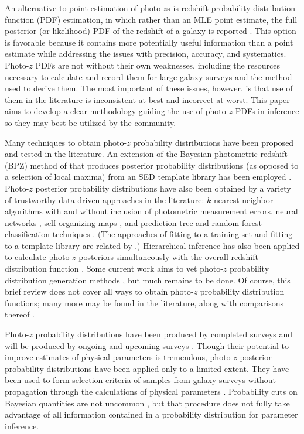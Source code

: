 An alternative to point estimation of photo-$z$s is redshift probability distribution function (PDF) estimation, in which rather than an MLE point estimate, the full posterior (or likelihood) PDF of the redshift of a galaxy is reported \citep{Koo1999}.  
This option is favorable because it contains more potentially useful information than a point estimate while addressing the issues with precision, accuracy, and systematics.  
Photo-$z$ PDFs are not without their own weaknesses, including the resources necessary to calculate and record them for large galaxy surveys \citep{CarrascoKind2014} and the method used to derive them.  
The most important of these issues, however, is that use of them in the literature is inconsistent at best and incorrect at worst.  
This paper aims to develop a clear methodology guiding the use of photo-$z$ PDFs in inference so they may best be utilized by the community.

Many techniques to obtain photo-$z$ probability distributions have been proposed and tested in the literature.  
An extension of the Bayesian photometric redshift (BPZ) method of \citet{Benitez2000} that produces posterior probability distributions (as opposed to a selection of local maxima) from an SED template library has been employed \citep{Hildebrandt2012, Kelly2014, Lopez-Sanjuan2015}.  
Photo-$z$ posterior probability distributions have also been obtained by a variety of trustworthy data-driven approaches in the literature: $k$-nearest neighbor algorithms with \citep{Ball2008} and without \citep{Sheldon2012} inclusion of photometric measurement errors, neural networks \citep{Bonnett2015a}, self-organizing maps \citep{CarrascoKind2014a}, and prediction tree and random forest classification techniques \citep{Carliles2010, CarrascoKind2013}.  
(The approaches of fitting to a training set and fitting to a template library are related by \citet{Budavari2009}.)  
Hierarchical inference has also been applied to calculate photo-$z$ posteriors simultaneously with the overall redshift distribution function \citep{Leistedt2016}.  
Some current work aims to vet photo-$z$ probability distribution generation methods \citep{Wittman2016}, but much remains to be done.  
Of course, this brief review does not cover all ways to obtain photo-$z$ probability distribution functions; many more may be found in the literature, along with comparisons thereof \citep{Hildebrandt2010, Dahlen2013, Sanchez2013, Bonnett2015}.

Photo-$z$ probability distributions have been produced by completed surveys \citep{Hildebrandt2012, Sheldon2012} and will be produced by ongoing and upcoming surveys \citep{LSSTScienceCollaboration2009, CarrascoKind2014a, Bonnett2015, Masters2015}.  
Though their potential to improve estimates of physical parameters is tremendous, photo-$z$ posterior probability distributions have been applied only to a limited extent.  
They have been used to form selection criteria of samples from galaxy surveys without propagation 
through the calculations of physical parameters \citep{VanBreukelen2009,Viironen2015}.  
Probability cuts on Bayesian quantities are not uncommon \citep{Leung2015, DiPompeo2015a}, but that procedure does not fully take advantage of all information contained in a probability distribution for parameter inference.  

